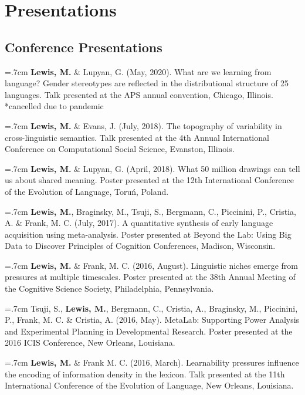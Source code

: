 \documentclass[letterpaper]{article}
\begin{document}
\section*{Presentations}
\onehalfspacing

\subsection*{Conference Presentations}

 \hangindent=.7cm {\bf Lewis, M.} \& Lupyan, G. (May, 2020). What are we learning from language? Gender stereotypes are reflected in the distributional structure of 25 languages. Talk presented at the APS annual convention, Chicago, Illinois. *cancelled due to pandemic


 \hangindent=.7cm {\bf Lewis, M.} \& Evans, J. (July, 2018). The topography of variability in cross-linguistic semantics. Talk presented at the 4th Annual International Conference on Computational Social Science, Evanston, Illinois.

 \hangindent=.7cm {\bf Lewis, M.} \& Lupyan, G. (April, 2018). What 50 million drawings can tell us about shared meaning. Poster presented at the 12th International Conference of the Evolution of Language, Toru\'{n}, Poland.

 \hangindent=.7cm {\bf Lewis, M.}, Braginsky, M., Tsuji, S., Bergmann, C., Piccinini, P., Cristia, A. \& Frank, M. C. (July, 2017). A quantitative synthesis of early language acquisition using meta-analysis. Poster presented at Beyond the Lab: Using Big Data to Discover Principles of Cognition Conferences, Madison, Wisconsin.

\hangindent=.7cm {\bf Lewis, M.} \& Frank, M. C. (2016, August).  Linguistic niches emerge from pressures at multiple timescales. Poster presented at the 38th Annual Meeting of the Cognitive Science Society, Philadelphia, Pennsylvania.

 \hangindent=.7cm  Tsuji, S., {\bf Lewis, M.}, Bergmann, C., Cristia, A.,  Braginsky, M.,  Piccinini, P., Frank, M. C. \& Cristia, A. (2016, May). MetaLab: Supporting Power Analysis and Experimental Planning in Developmental Research. Poster presented at the 2016 ICIS Conference, New Orleans, Louisiana.


  \hangindent=.7cm {\bf Lewis, M.} \& Frank M. C. (2016, March). Learnability pressures influence the encoding of information density in the lexicon. Talk presented at the 11th International Conference of the Evolution of Language, New Orleans, Louisiana.
\end{document}
